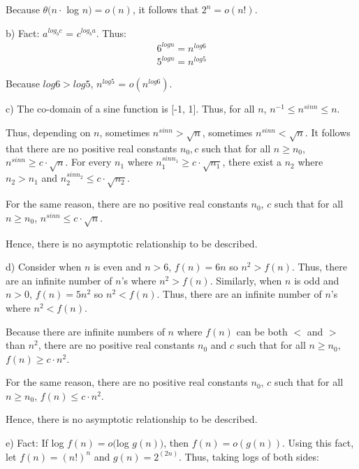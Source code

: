 \documentclass[a4paper]{report}
\begin{document}
\begin{enumerate}
      Because $\theta(n \cdot$ log $n) = o(n)$, it follows that $2^n = o(n!)$.

      \bigskip
      b) Fact: $a^{log_{b} c}$ = $c ^ {log_{b} a} $. Thus:
      \begin{align}
        6^{log n} = n^{log 6} \\
        5^{log n} = n^{log 5} 
      \end{align}

      Because $log 6 > log 5$, $n^{log 5}$ = $o(n^{log 6})$.

      \bigskip
      c) The co-domain of a sine function is [-1, 1]. Thus, for all $n$, $n^{-1} \leq n^{sin n} \leq n$.

      Thus, depending on $n$, sometimes $n^{sin n} > \sqrt{n}$, sometimes $n^{sin n} < \sqrt{n}$.
      It follows that there are no positive real constants $n_{0}, c$ such that for all $n \geq n_{0}$,  $n^{sin n} \geq c \cdot \sqrt{n}$.
      For every $n_{1}$ where $n_{1}^{sin n_{1}} \geq c \cdot \sqrt{n_{1}}$, there exist a $n_{2}$ where $n_{2} > n_{1}$ and $n_{2}^{sin n_{2}} \leq c \cdot \sqrt{n_{2}}$.

      For the same reason, there are no positive real constants $n_{0}$, $c$ such that for all $n \geq n_{0}$, 
      $n^{sin n} \leq c \cdot \sqrt{n}$.

      Hence, there is no asymptotic relationship to be described.

      \bigskip
      d) 
      Consider when $n$ is even and $n > 6$, $f(n) = 6n$ so $n^2 > f(n)$. Thus, there are an infinite number of $n$'s where $n^2 > f(n)$.
      Similarly, when $n$ is odd and $n > 0$, $f(n) = 5n^2$ so $n^2 < f(n)$. Thus, there are an infinite number of $n$'s where $n^2 < f(n)$. 

      Because there are infinite numbers of $n$ where $f(n)$ can be both $<$ and $>$ than $n^2$, there are no positive real constants $n_{0}$ and $c$ such that 
      for all $n \geq n_{0}$, $f(n) \geq c \cdot n^2$.

      For the same reason, there are no positive real constants $n_{0}$, $c$ such that for all $n \geq n_{0}$, 
      $f(n) \leq c \cdot n^2$.

      Hence, there is no asymptotic relationship to be described.

      \bigskip
      e) Fact: If log $f(n) = o($log $g(n))$, then $f(n) = o(g(n))$. 
      Using this fact, let $f(n) = (n!)^{n}$ and $g(n) = 2^(2n)$. Thus, taking logs of both sides:


\end{enumerate}
\end{document}
